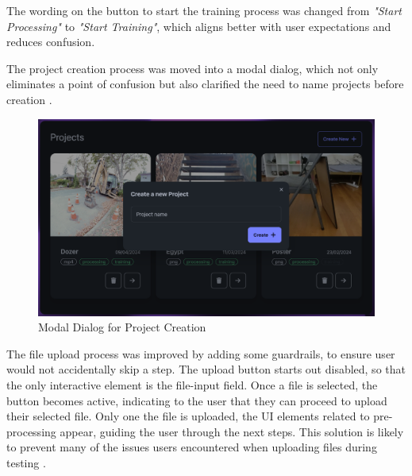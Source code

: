 The wording on the button to start the training process was changed from \emph{"Start Processing"} to \emph{"Start Training"}, which aligns better with user expectations and reduces confusion.


The project creation process was moved into a modal dialog, which not only eliminates a point of confusion but also clarified the need to name projects before creation .

\begin{figure}[htb]
  \centering
	\includegraphics[width=.65\textwidth]{figures/fix-3.png}
	\caption{Modal Dialog for Project Creation}
  \label{fig:fix-3}
\end{figure}

The file upload process was improved by adding some guardrails, to ensure user would not accidentally skip a step.
The upload button starts out disabled, so that the only interactive element is the file-input field.
Once a file is selected, the button becomes active, indicating to the user that they can proceed to upload their selected file.
Only one the file is uploaded, the UI elements related to pre-processing appear, guiding the user through the next steps.
This solution is likely to prevent many of the issues users encountered when uploading files during testing .


